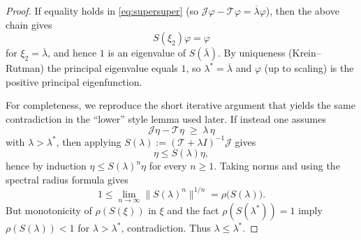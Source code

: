 \documentclass[a4paper,11pt]{amsart}
\theoremstyle{definition}
\numberwithin{equation}{section}
\theoremstyle{definition}
\begin{document}
\begin{proof}
If equality holds in \eqref{eq:supersuper} (so \(\mathscr J\varphi - \mathscr T\varphi = \overline\lambda\varphi\)), then the above chain gives
\[
S(\xi_2)\varphi = \varphi
\]
for \(\xi_2=\overline\lambda\), and hence \(1\) is an eigenvalue of \(S(\overline\lambda)\). By uniqueness (Krein–Rutman) the principal eigenvalue equals \(1\), so \(\lambda^\ast=\overline\lambda\) and \(\varphi\) (up to scaling) is the positive principal eigenfunction.

\medskip

For completeness, we reproduce the short iterative argument that yields the same contradiction in the ``lower'' style lemma used later. If instead one assumes
\[
\mathscr J\eta - \mathscr T\eta \;\ge\; \lambda\,\eta
\]
with \(\lambda>\lambda^\ast\), then applying \(S(\lambda):=(\mathscr T+\lambda I)^{-1}\mathscr J\) gives
\[
\eta \leq S(\lambda)\eta,
\]
hence by induction \(\eta \leq S(\lambda)^n\eta\) for every \(n\geq1\). Taking norms and using the spectral radius formula gives
\[
1 \leq \lim_{n\to\infty} \|S(\lambda)^n\|^{1/n} = \rho\big(S(\lambda)\big).
\]
But monotonicity of \(\rho(S(\xi))\) in \(\xi\) and the fact \(\rho(S(\lambda^\ast))=1\) imply \(\rho(S(\lambda))<1\) for \(\lambda>\lambda^\ast\), contradiction. Thus \(\lambda\le\lambda^\ast\).
\end{proof}
\end{document}
